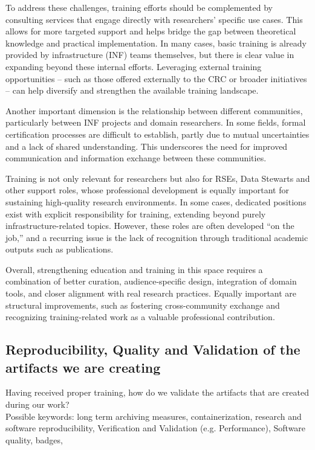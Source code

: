 \documentclass{eceasst}
\begin{document}
To address these challenges, training efforts should be complemented by consulting services that engage directly with researchers’ specific use cases.
This allows for more targeted support and helps bridge the gap between theoretical knowledge and practical implementation.
In many cases, basic training is already provided by infrastructure (INF) teams themselves, but there is clear value in expanding beyond these internal efforts.
Leveraging external training opportunities -- such as those offered externally to the CRC or broader initiatives -- can help diversify and strengthen the available training landscape.

Another important dimension is the relationship between different communities, particularly between INF projects and domain researchers.
In some fields, formal certification processes are difficult to establish, partly due to mutual uncertainties and a lack of shared understanding.
This underscores the need for improved communication and information exchange between these communities.

Training is not only relevant for researchers but also for RSEs, Data Stewarts and other support roles, whose professional development is equally important for sustaining high-quality research environments.
In some cases, dedicated positions exist with explicit responsibility for training, extending beyond purely infrastructure-related topics.
However, these roles are often developed “on the job,” and a recurring issue is the lack of recognition through traditional academic outputs such as publications.

Overall, strengthening education and training in this space requires a combination of better curation, audience-specific design, integration of domain tools, and closer alignment with real research practices. Equally important are structural improvements, such as fostering cross-community exchange and recognizing training-related work as a valuable professional contribution.


\subsection{Reproducibility, Quality and Validation of the artifacts we are creating}
Having received proper training, how do we validate the artifacts that are created during our work?\\
Possible keywords: long term archiving measures, containerization, research and software reproducibility, Verification and Validation (e.g. Performance), Software quality, badges,\\
\end{document}
